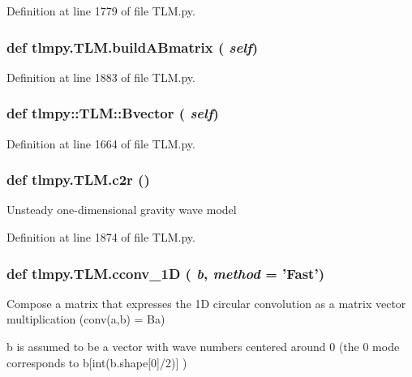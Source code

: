 Definition at line 1779 of file TLM.py.\hypertarget{namespacetlmpy_1_1TLM_a99b585016099ac73bccd67a53007b4e5}{
\subsubsection[{buildABmatrix}]{\setlength{\rightskip}{0pt plus 5cm}def tlmpy.TLM.buildABmatrix ( {\em self})}}
\label{namespacetlmpy_1_1TLM_a99b585016099ac73bccd67a53007b4e5}


Definition at line 1883 of file TLM.py.\hypertarget{namespacetlmpy_1_1TLM_ac14e3266c64ab5a1cca8c853aba8ec4a}{
\subsubsection[{Bvector}]{\setlength{\rightskip}{0pt plus 5cm}def tlmpy::TLM::Bvector ( {\em self})}}
\label{namespacetlmpy_1_1TLM_ac14e3266c64ab5a1cca8c853aba8ec4a}


Definition at line 1664 of file TLM.py.\hypertarget{namespacetlmpy_1_1TLM_ae884a3fe664a15ec2887eb5774de5644}{
\subsubsection[{c2r}]{\setlength{\rightskip}{0pt plus 5cm}def tlmpy.TLM.c2r ()}}
\label{namespacetlmpy_1_1TLM_ae884a3fe664a15ec2887eb5774de5644}
\begin{DoxyVerb}
Unsteady one-dimensional gravity wave model
\end{DoxyVerb}
 

Definition at line 1874 of file TLM.py.\hypertarget{namespacetlmpy_1_1TLM_af212f19a8c1e7390e05d92f0ecfe4261}{
\subsubsection[{cconv\_\-1D}]{\setlength{\rightskip}{0pt plus 5cm}def tlmpy.TLM.cconv\_\-1D ( {\em b}, \/   {\em method} = {\ttfamily 'Fast'})}}
\label{namespacetlmpy_1_1TLM_af212f19a8c1e7390e05d92f0ecfe4261}
\begin{DoxyVerb}
Compose a matrix that expresses the 1D circular convolution
as a matrix vector multiplication (conv(a,b) = Ba)

b is assumed to be a vector with wave numbers centered around 0
(the 0 mode corresponds to b[int(b.shape[0]/2)] )
\end{DoxyVerb}
 

